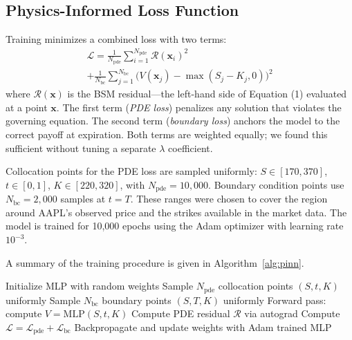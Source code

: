 \documentclass[11pt, twocolumn]{article}
\begin{document}
\subsection{Physics-Informed Loss Function}
Training minimizes a combined loss with two terms:
\begin{equation}
\begin{split}
\mathcal{L} = \frac{1}{N_{\text{pde}}} \sum_{i=1}^{N_{\text{pde}}} \mathcal{R}(\mathbf{x}_i)^2 \\
+ \frac{1}{N_{\text{bc}}} \sum_{j=1}^{N_{\text{bc}}} \bigl(V(\mathbf{x}_j) - \max(S_j - K_j, 0)\bigr)^2
\end{split}
\end{equation}
where $\mathcal{R}(\mathbf{x})$ is the BSM residual—the left-hand side of Equation (1) evaluated at a point $\mathbf{x}$. The first term (\textit{PDE loss}) penalizes any solution that violates the governing equation. The second term (\textit{boundary loss}) anchors the model to the correct payoff at expiration. Both terms are weighted equally; we found this sufficient without tuning a separate $\lambda$ coefficient.

Collocation points for the PDE loss are sampled uniformly: $S \in [170, 370]$, $t \in [0, 1]$, $K \in [220, 320]$, with $N_{\text{pde}} = 10{,}000$. Boundary condition points use $N_{\text{bc}} = 2{,}000$ samples at $t = T$. These ranges were chosen to cover the region around AAPL's observed price and the strikes available in the market data. The model is trained for 10,000 epochs using the Adam optimizer \cite{kingma2014adam} with learning rate $10^{-3}$.

A summary of the training procedure is given in Algorithm~\ref{alg:pinn}.

\begin{algorithm}
\caption{PINN Training for BSM Option Pricing}
\label{alg:pinn}
\begin{algorithmic}[1]
\State Initialize MLP with random weights
\State Sample $N_{\text{pde}}$ collocation points $(S, t, K)$ uniformly
\State Sample $N_{\text{bc}}$ boundary points $(S, T, K)$ uniformly
    \State Forward pass: compute $V = \text{MLP}(S, t, K)$
    \State Compute PDE residual $\mathcal{R}$ via autograd
    \State Compute $\mathcal{L} = \mathcal{L}_{\text{pde}} + \mathcal{L}_{\text{bc}}$
    \State Backpropagate and update weights with Adam
\EndFor
\State \Return trained MLP
\end{algorithmic}
\end{algorithm}
\end{document}
